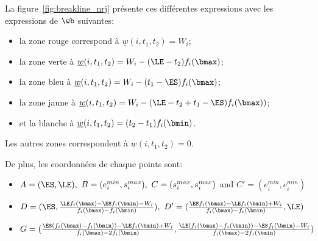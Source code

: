La figure~\ref{fig:breakline_nrj} présente ces différentes expressions
avec les expressions de $\wb$ suivantes: 
\begin{itemize}
\item la zone rouge correspond à $\underline{w}(i,t_1,t_2)=W_i$;
\item la zone verte à $\underline{w}(i,t_1,t_2)=W_i-(\LE-t_2)f_i(\bmax)$;
\item la zone bleu à $\underline{w}(i,t_1,t_2)=W_i-(t_1-\ES)f_i(\bmax)$;
\item la zone jaune à
  $\underline{w}(i,t_1,t_2)=W_i-(\LE-t_2+t_1-\ES)f_i(\bmax))$;
\item et la blanche à $\underline{w}(i,t_1,t_2)=(t_2-t_1)f_i(\bmin)$.
\end{itemize}
Les autres zones correspondent à $\underline{w}(i,t_1,t_2)=0$.

De plus, les coordonnées de chaque points sont:
\begin{itemize}
\item $A=(\ES,\LE),\ B=(e_i^{min},s_i^{max}),\
C=(s_i^{max},s_i^{max})$ and $C'=(e_i^{min},e_i^{min})$
\item
$D=(\ES,\frac{\LE f_i(\bmax)-\ES f_i(\bmin)-W_i}{f_i(\bmax)-f_i(\bmin)}),\
D'=(\frac{\ES f_i(\bmax)-\LE f_i(\bmin)+W_i}{f_i(\bmax)-f_i(\bmin)},\LE)$
\item
$G=(\frac{\ES(f_i(\bmax)-f_i(\bmin))-\LE f_i(\bmin)+W_i}{f_i(\bmax)-2f_i(\bmin)},
\frac{\LE(f_i(\bmax)-f_i(\bmin))-\ES f_i(\bmin)-W_i}{f_i(\bmax)-2f_i(\bmin)})$
\end{itemize}


